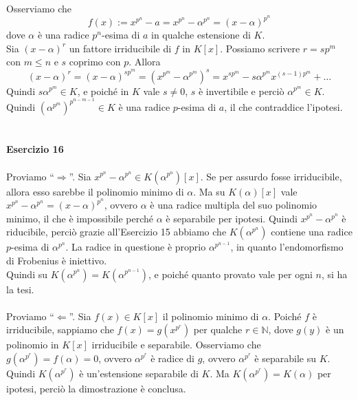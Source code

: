 \documentclass[12pt,a4paper]{report}
\theoremstyle{definition}
\begin{document}
\\
Osserviamo che
$$f(x):=x^{p^n}-a=x^{p^n}-\alpha^{p^n}=(x-\alpha)^{p^n}$$
dove $\alpha$ è una radice $p^n$-esima di $a$ in qualche estensione di $K$.\\
Sia $(x-\alpha)^r$ un fattore irriducibile di $f$ in $K[x]$. Possiamo scrivere $r=s p^m$ con $m \leq n$ e $s$ coprimo con $p$. Allora
$$(x-\alpha)^r=(x-\alpha)^{s p^m}=(x^{p^m}-\alpha^{p^m})^s= x^{sp^m}-s\alpha^{p^m} x^{(s-1)p^m}+ \dots$$
Quindi $s\alpha^{p^m} \in K$, e poiché in $K$ vale $s \neq 0$, $s$ è invertibile e perciò $\alpha^{p^m} \in K$. Quindi $(\alpha^{p^m})^{p^{n-m-1}} \in K$ è una radice $p$-esima di $a$, il che contraddice l'ipotesi.
\\
\\
\\
\noindent\textbf{Esercizio 16}\\
\\
Proviamo ``$\Longrightarrow$''. Sia $x^{p^n}-\alpha^{p^n} \in K(\alpha^{p^n})[x]$. Se per assurdo fosse irriducibile, allora esso sarebbe il polinomio minimo di $\alpha$. Ma su $K(\alpha)[x]$ vale $x^{p^n}-\alpha^{p^n}=(x-\alpha)^{p^n}$, ovvero $\alpha$ è una radice multipla del suo polinomio minimo, il che è impossibile perché $\alpha$ è separabile per ipotesi. Quindi $x^{p^n}-\alpha^{p^n}$ è riducibile, perciò grazie all'Esercizio 15 abbiamo che $K(\alpha^{p^n})$ contiene una radice $p$-esima di $\alpha^{p^n}$. La radice in questione è proprio $\alpha^{p^{n-1}}$, in quanto l'endomorfismo di Frobenius è iniettivo.\\
Quindi su $K(\alpha^{p^n})=K(\alpha^{p^{n-1}})$, e poiché quanto provato vale per ogni $n$, si ha la tesi.\\
\\
Proviamo ``$\Longleftarrow$''. Sia $f(x) \in K[x]$ il polinomio minimo di $\alpha$. Poiché $f$ è irriducibile, sappiamo che $f(x)=g(x^{p^r})$ per qualche $r \in \mathbb{N}$, dove $g(y)$ è un polinomio in $K[x]$ irriducibile e separabile. Osserviamo che $g(\alpha^{p^r})=f(\alpha)=0$, ovvero $\alpha^{p^r}$ è radice di $g$, ovvero $\alpha^{p^r}$ è separabile su $K$. Quindi $K(\alpha^{p^r})$ è un'estensione separabile di $K$. Ma $K(\alpha^{p^r})=K(\alpha)$ per ipotesi, perciò la dimostrazione è conclusa.
\end{document}
